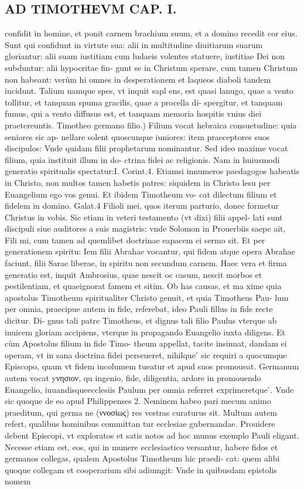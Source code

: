 \documentclass{article}
\begin{document}
\begin{pages}
\section*{AD TIMOTHEVM CAP. I. }
\marginpar{[ p.5 ]}\pstart confidit in homine, et ponit carnem brachium suum, et a domino recedit cor eius. Sunt qui confidunt in virtute sua: alii in multitudine diuitiarum suarum gloriantur: alii suam iustitiam cum ludaeis volentes statuere, iustitiae Dei non subduntur: alii hypocritae fin- gunt se in Christum sperare, cum tamen Christum non habeant: verùm hi omnes in desperationem et laqueos diaboli tandem incidunt. Talium namque  spes, vt inquit sapl ens, est quasi lanugo, quae a vento tollitur, et tanquam spuma gracilis, quae a procella di- spergitur, et tanquam fumus, qui a vento diffusus est, et tanquam memoria hospitis vnius diei praetereuntis.  \pend\pstart Timotheo germano filio.) Filium vocat hebraica consuetudine: quia seniores sic ap- nellare solent quoscunque  iuniores: item praeceptores suos discipulos: Vnde quidam filii prophetarum nominantur. Sed ideo maxime vocat filium, quia instituit illum in do- ctrina fidei ac religionis. Nam in huiusmodi generatio spiritualis spectatur:I. Corint.4. Etiamsi innumeros paedagogos habeatis in Christo, non multos tamen habetis patres: siquidem in Christo lesu per Euangelium ego vos genui. Et ibidem Timotheum vo-   cat dilectum filium et fidelem in domino. Galat.4 Filioli mei, quos iterum parturio, donec formetur Christus in vobis. Sic etiam in veteri testamento (vt dixi) filii appel- lati sunt discipuli siue auditores a suis magistris: vnde Solomon in Prouerbiis saepe ait, Fili mi, cum tamen ad quemlibet doctrinae eapacem ei sermo sit. Et per generationem spiritu: Iem filii Abrahae vocantur, qui fidem atque  opera Abrahae faciunt, filii Sarae liberae, in spiritu non secundum carnem. Haec vera et firma generatio est, inquit Ambrosius, quae nescit oc casum, nescit morbos et pestilentiam, et quaeignorat famem et sitim. Ob has causas, et ma xime quia apostolus Timotheum spiritualiter Christo genuit, et quia Timotheus Pau- lum per omnia, praecipue autem in fide, referebat, ideo Pauli fillus in fide recte dicitur. Di- gnus tali patre Timotheus, et dignus tali filio Paulus vterque  ab inuicem gloriam accipiens, vterque  in propagando Euangelio iuxta diligens. Et cùm Apostolus filium in fide Timo- theum appellat, tacite insinuat, dandam ei operam, vt in sana doctrina fidei perseueret, nihilque ́ sic requiri a quocumque  Episcopo, quam vt fidem incolumem tueatur et apud suos promoueat.  \pend\pstart Germanum autem vocat yνησιον, qu ingenio, fide, diligentia, ardore in promouendo Euangelio, iuuandisqueecclesiis Paulum per omnia referret exprimeretque ́. Vnde sic quoque  de eo apud Philippenses 2. Neminem habeo pari mecum animo praeditum, qui germa ne (ννοσίως) res vestras curaturus sit. Multum autem refert, qualibus hominibus committan tur ecclesiae gubernandae. Prouidere debent Episcopi, vt exploratos et satis notos ad hoc munus exemplo Pauli eligant. Necesse etiam est, eos, qui in munere ecclesiastico versantur, habere fidos et germanos collegas, qualem Apostolus Timotheum hic praedi- cat: quem alibi quoque  collegam et cooperarium sibi adiumgit: Vnde in quibusdam epistolis nomem 
\end{pages}
\end{document}
